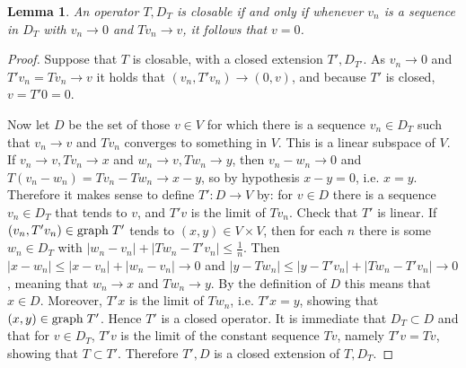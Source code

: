 \documentclass{article}
\newcommand{\graph}{\ensuremath\mathrm{graph}\;}
\newtheorem{lemma}[theorem]{Lemma}
\theoremstyle{definition}
\begin{document}
\begin{lemma}
An operator $T,D_T$ is closable if and only if whenever $v_n$ is a sequence in $D_T$ with
$v_n \to 0$ and $Tv_n \to v$, it follows that $v=0$.
\end{lemma}
\begin{proof}
Suppose that $T$ is closable, with a closed extension $T',D_{T'}$. As $v_n \to 0$ and $T'v_n = Tv_n \to v$
it holds that $(v_n,T'v_n) \to (0,v)$, and because $T'$ is closed, $v=T'0=0$.

Now let $D$ be the set of those $v \in V$ for which there is a sequence
$v_n \in D_T$ such that $v_n \to v$ and $Tv_n$ converges to something in $V$.
This is a linear subspace of $V$. If $v_n \to v, Tv_n \to x$
and $w_n \to v, Tw_n \to y$, then $v_n-w_n \to 0$ and 
$T(v_n-w_n)=Tv_n-Tw_n \to x-y$, so by hypothesis $x-y=0$, i.e. $x=y$. 
Therefore it makes sense to define $T':D \to V$ by: for $v \in D$ there is a sequence 
$v_n \in D_T$ that tends to $v$, and $T'v$ is the limit of $Tv_n$. 
Check that $T'$ is linear. If $(v_n,T'v_n) \in \graph T'$ tends to $(x,y) \in V \times V$,
then for each $n$ there is some $w_n \in D_T$ with 
$|w_n-v_n|+|Tw_n-T'v_n| \leq \frac{1}{n}$. Then $|x-w_n|
\leq |x-v_n| + |w_n-v_n| \to 0$ and
$|y-Tw_n| \leq |y-T'v_n| + |Tw_n - T'v_n| \to 0$, meaning that
$w_n \to x$ and $Tw_n \to y$. By the definition of $D$ this means that
$x \in D$. Moreover, $T'x$ is the limit of $Tw_n$, i.e. $T'x=y$, showing that
$(x,y) \in \graph T'$. Hence $T'$ is a closed operator. 
It is immediate that $D_T \subset D$ and that for
$v \in D_T$, $T'v$ is the limit of the constant sequence
$Tv$, namely $T'v=Tv$, showing that $T \subset T'$. Therefore
$T',D$ is a closed extension of $T,D_T$. 
\end{proof}
\end{document}
